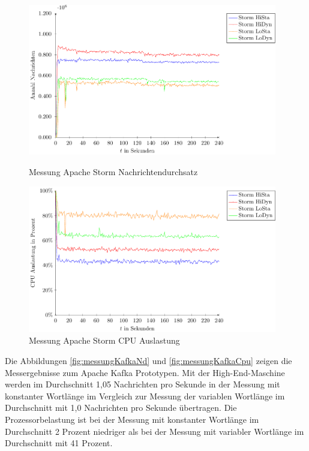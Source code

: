 \begin{figure}[!ht]
\includegraphics[width=0.97\textwidth]{plots/messungStormDurchsatz.pdf}
\caption{Messung Apache Storm Nachrichtendurchsatz
\label{fig:messungStormDurchsatz}}
\includegraphics[width=0.97\textwidth]{plots/messungStormCpu.pdf}
\caption{Messung Apache Storm CPU Auslastung
\label{fig:messungStormCpu}}
\end{figure}


Die Abbildungen \ref{fig:messungKafkaNd} und \ref{fig:messungKafkaCpu} zeigen die Messergebnisse zum Apache Kafka Prototypen. Mit der High-End-Maschine werden im Durchschnitt 1,05 Nachrichten pro Sekunde in der Messung mit konstanter Wortlänge im Vergleich zur Messung der variablen Wortlänge im Durchschnitt mit 1,0 Nachrichten pro Sekunde übertragen. Die Prozessorbelastung ist bei der Messung mit konstanter Wortlänge im Durchschnitt 2 Prozent niedriger als bei der Messung mit variabler Wortlänge im Durchschnitt mit 41 Prozent. 


